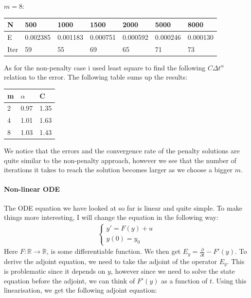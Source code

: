 \documentclass[11pt,a4paper]{report}
\begin{document}
$m=8$:
\begin{center}
    \begin{tabular}{| l | l | l | l | l | l | l |}
    \hline
    N & 500 & 1000  & 1500 & 2000 & 5000 & 8000 \\ \hline
    E & 0.002385 & 0.001183 &0.000751 & 0.000592 & 0.000246 & 0.000130	\\ \hline
    Iter & 59 & 55  & 69 & 65 & 71 & 73 \\ \hline
    \end{tabular}
\end{center}
As for the non-penalty case i used least square to find the following $C\Delta t^{\alpha}$ relation to the error. The following table sums up the results:
\begin{center}
    \begin{tabular}{| l | l | l |}
    \hline
    m & $\alpha$ & C \\ \hline
    2 &0.97 &1.35 \\ \hline
    4 & 1.01&1.63 \\ \hline
    8 & 1.03&1.43 \\ \hline
    \end{tabular}
\end{center}
We notice that the errors and the convergence rate of the penalty solutions are quite similar to the non-penalty approach, however we see that the number of iterations it takes to reach the solution becomes larger as we choose a bigger $m$. 
\\
\\
\textbf{Non-linear ODE}
\\
\\
The ODE equation we have looked at so far is linear and quite simple. To make things more interesting, I will change the equation in the following way:
 \begin{align*}
\left\{
     \begin{array}{lr}
       	y'= F(y) +u\\
       	   y(0)=y_0
     \end{array}
   \right.
\end{align*} 
Here $F:\mathbb{R} \rightarrow \mathbb{R}$, is some differentiable function. We then get $E_y = \frac{\partial}{\partial t} - F'(y)$. To derive the adjoint equation, we need to take the adjoint of the operator $E_y$. This is problematic since it depends on $y$, however since we need to solve the state equation before the adjoint, we can think of $F'(y)$ as a function of $t$. Using this linearisation, we get the following adjoint equation: 
\end{document}
